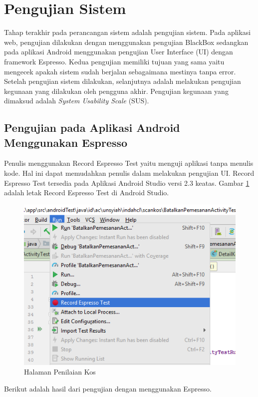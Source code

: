 		
	\section{Pengujian Sistem}	
	Tahap terakhir pada perancangan sistem adalah pengujian sistem. Pada aplikasi web, pengujian dilakukan dengan menggunakan pengujian BlackBox sedangkan pada aplikasi Android menggunakan pengujian User Interface (UI) dengan framework Espresso. Kedua pengujian memiliki tujuan yang sama yaitu mengecek apakah sistem sudah berjalan sebagaimana mestinya tanpa error. Setelah pengujian sistem dilakukan, selanjutnya adalah melakukan pengujian kegunaan yang dilakukan oleh pengguna akhir. Pengujian kegunaan yang dimaksud adalah \textit{System Usability Scale} (SUS). 
	
	\subsection{Pengujian pada Aplikasi Android Menggunakan Espresso}
		
		Penulis menggunakan Record Espresso Test yaitu menguji aplikasi tanpa menulis kode. Hal ini dapat memudahkan penulis dalam melakukan pengujian UI. Record Espresso Test tersedia pada Aplikasi Android Studio versi 2.3 keatas. Gambar \ref{espresso} adalah letak Record Espresso Test di Android Studio.
		
		\begin{figure}[H]
			\centering
			\includegraphics[scale=0.6]{gambar/espresso}
			\caption{Halaman Penilaian Kos}
			\label{espresso}
		\end{figure}
		
		Berikut adalah hasil dari pengujian dengan menggunakan Espresso.
		
